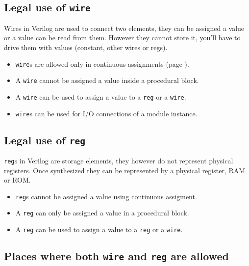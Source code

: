 \documentclass[a4paper,10pt]{article}
\theoremstyle{mytheor}
\begin{document}
\subsection{Legal use of \lstinline[style=verilog-inline-style]{wire}}
Wires in Verilog are used to connect two elements, they can be
assigned a value or a value can be read from them. However they cannot
store it, you'll have to drive them with values (constant, other wires
or regs).

\begin{itemize}
\item \lstinline[style=verilog-inline-style]{wire}s are allowed only
  in continuous assignments (page \pageref{continuous-assignment}).
\item A \lstinline[style=verilog-inline-style]{wire} cannot be
  assigned a value inside a procedural block.
\item A \lstinline[style=verilog-inline-style]{wire} can be used to
  assign a value to a \lstinline[style=verilog-inline-style]{reg} or a
  \lstinline[style=verilog-inline-style]{wire}.
\item \lstinline[style=verilog-inline-style]{wire}s can be used for I/O connections of a module instance.
\end{itemize}

\subsection{Legal use of \lstinline[style=verilog-inline-style]{reg}}
\lstinline[style=verilog-inline-style]{reg}s in Verilog are storage
elements, they however do not represent physical registers. Once
synthesized they can be represented by a physical register, RAM or
ROM.

 \begin{itemize}
 \item \lstinline[style=verilog-inline-style]{reg}s cannot be assigned
   a value using continuous assigment.
 \item A \lstinline[style=verilog-inline-style]{reg} can only be
   assigned a value in a procedural block.
 \item A \lstinline[style=verilog-inline-style]{reg} can be used to
   assign a value to a \lstinline[style=verilog-inline-style]{reg} or
   a \lstinline[style=verilog-inline-style]{wire}.
\end{itemize}

 \subsection{Places where both \lstinline[style=verilog-inline-style]{wire} and \lstinline[style=verilog-inline-style]{reg} are allowed}
\end{document}

